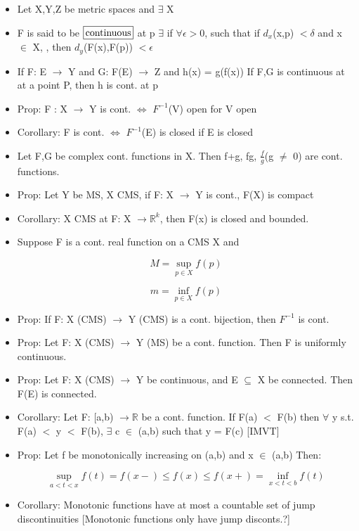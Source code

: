 \documentclass[11pt]{article}
\newcommand{\boxinate}[1]{\framebox[1.1\width]{#1}}
\begin{document}
\begin{itemize}

\item Let X,Y,Z be metric spaces and $\exists$  X

\item F is said to be $\boxinate{continuous}$ at p $\exists$ if $\forall
  \epsilon >$0, such that if $d_{x}$(x,p) $< \delta$ and x $\in$ X, , then
  $d_y$(F(x),F(p)) $< \epsilon$


\item If F: E $\rightarrow$  Y and G: F(E) $\rightarrow$ Z and h(x) = g(f(x))
  If F,G is continuous at at a point P, then h is cont. at p



\item Prop: F : X $\rightarrow$ Y is cont. $\iff$ $F^{-1}$(V) open for V open


\item Corollary: F is cont. $\iff$ $F^{-1}$(E) is closed if E is closed

\item Let F,G be complex cont. functions in X. Then f+g, fg, $\frac{f}{g}$(g
  $\neq$ 0) are cont. functions.


\item Prop: Let Y be MS, X CMS, if F: X $\rightarrow$ Y is cont., F(X) is
  compact


\item Corollary: X CMS at F: X $\rightarrow \mathbb{R}^k$, then F(x) is closed
  and bounded.

\item Suppose F is a cont. real function on a CMS X and

  $$M = \sup_{p \in X}f(p)$$

  $$m = \inf_{p \in X}f(p)$$

\item Prop: If F: X (CMS) $\rightarrow$ Y (CMS) is a cont. bijection, then
  $F^{-1}$ is cont.

\item Prop: Let F: X (CMS) $\rightarrow$ Y (MS) be a cont. function. Then F is
  uniformly continuous.

\item Prop: Let F: X (CMS) $\rightarrow$ Y be continuous, and E $\subseteq$ X
  be connected. Then F(E) is connected.

\item Corollary: Let F: [a,b) $\rightarrow \mathbb{R}$ be a cont. function. If
  F(a) $<$ F(b) then $\forall$ y s.t. F(a) $<$ y $<$ F(b), $\exists$ c $\in$
  (a,b) such that y = F(c) [IMVT]

\item Prop: Let f be monotonically increasing on (a,b) and x $\in$ (a,b) Then:

  $$ \sup_{a < t < x} f(t) = f(x-) \leq f(x) \leq f(x+) = \inf_{x < t < b}
  f(t) $$

\item Corollary: Monotonic functions have at most a countable set of jump
  discontinuities [Monotonic functions only have jump disconts.?]

\end{itemize}
\end{document}

